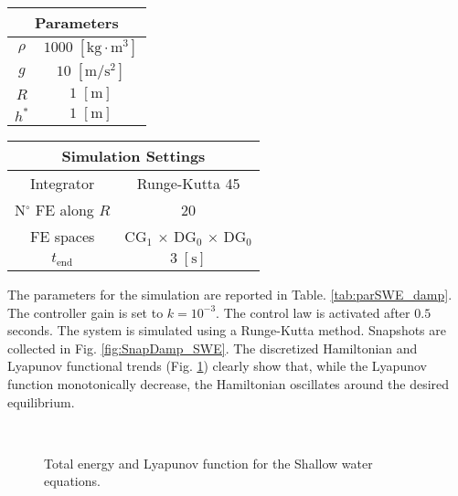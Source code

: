 \begin{table}[th]
	\centering
	\begin{tabular}{|c|c|}
		\hline 
		\multicolumn{2}{|c|}{Parameters} \\ 
		\hline 
		$\rho$ & $1000\; \mathrm{[kg \cdot m^3]}$ \\ 
		$g$& $10\; \mathrm{[m/s^2]}$ \\ 
		$R$& $1\; \mathrm{[m]}$\\ 
		$h^*$& $1\; \mathrm{[m]}$ \\ 
		\hline 
	\end{tabular} \hspace{1cm}
	\begin{tabular}{|c|c|}
		\hline 
		\multicolumn{2}{|c|}{Simulation Settings} \\
		\hline 
		Integrator & Runge-Kutta 45 \\
		N$^\circ$ FE along $R$ & 20 \\
		FE spaces & CG$_1$ $\times$ DG$_0$ $\times$ DG$_0$\\
		$t_{\text{end}}$ & $3\; \mathrm{[s]}$\\ 
		\hline 
	\end{tabular} 
	\captionsetup{width=0.95\linewidth}
	\vspace{1mm}
	\label{tab:parSWE_damp}
\end{table}

The parameters for the simulation are reported in Table. \eqref{tab:parSWE_damp}. The controller gain is set to $k = 10^{-3}$. The control law is activated after $0.5$ seconds. The system is simulated using a Runge-Kutta method. Snapshots are collected in Fig. \ref{fig:SnapDamp_SWE}. The discretized Hamiltonian and Lyapunov functional trends (Fig. \ref{fig:HL_SWE}) clearly show that, while the Lyapunov function monotonically decrease, the Hamiltonian oscillates around the desired equilibrium.



\begin{figure}[htb]%
	\centering
	\hspace{8pt}%
	 \\
	\caption{Total energy and Lyapunov function for the Shallow water equations.}%
	\label{fig:HL_SWE}%
\end{figure}


